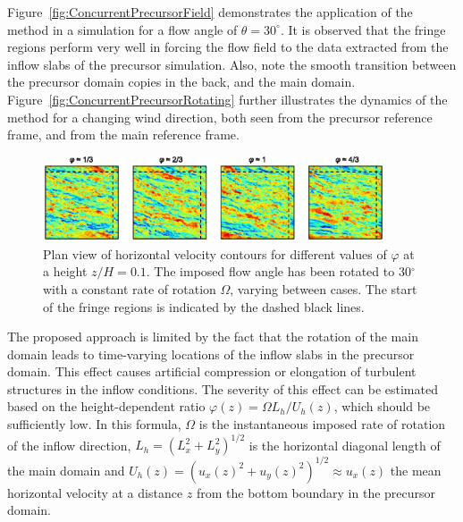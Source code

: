 	\clearpage
	Figure~\ref{fig:ConcurrentPrecursorField} demonstrates the application of the method in a simulation for a flow angle of $\theta = 30^\circ$. It is observed that the fringe regions perform very well in forcing the flow field to the data extracted from the inflow slabs of the precursor simulation. Also, note the smooth transition between the precursor domain copies in the back, and the main domain.
	Figure~\ref{fig:ConcurrentPrecursorRotating} further illustrates the dynamics of the method for a changing wind direction, both seen from the precursor reference frame, and from the main reference frame.

	\begin{figure}[tb!]
					\centering
		\includegraphics[width=0.9\textwidth]{chapters/turbulent_inflow/blm/figure8.eps}
		\caption{Plan view of horizontal velocity contours for different values of $\varphi$ at a height $z/H = 0.1$. The imposed flow angle has been rotated to 30$^\circ$ with a constant rate of rotation $\Omega$, varying between cases. The start of the fringe regions is indicated by the dashed black lines.}
		\label{fig:rotationrate}
	\end{figure}
	
	
	The proposed approach is limited by the fact that the rotation of the main domain leads to time-varying locations of the inflow slabs in the precursor domain. This effect causes artificial compression or elongation of turbulent structures in the inflow conditions. The severity of this effect can be estimated based on the height-dependent ratio $\varphi(z) = \Omega L_h/ U_h(z) $, which should be sufficiently low. In this formula, $\Omega$ is the instantaneous imposed rate of rotation of the inflow direction, $L_h = (L_x^2 + L_y^2)^{1/2}$ is the horizontal diagonal length of the main domain and $U_h(z) = (u_x(z)^2 + u_y(z)^2)^{1/2} \approx u_x(z)$ the mean horizontal velocity at a distance $z$ from the bottom boundary in the precursor domain.
	
